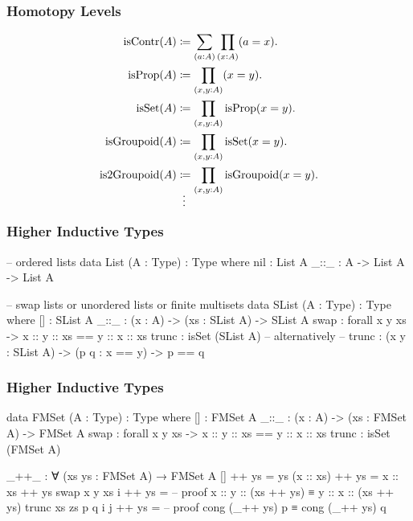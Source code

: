 \documentclass[9pt]{beamer}
\begin{document}
\begin{frame}
\frametitle{Homotopy Levels}

\begin{align*}
  \text{isContr}(A) & \coloneqq \sum_{(a:A)} \prod_{(x:A)} (a = x).
  \\
  \text{isProp}(A) & \coloneqq \prod_{(x,y:A)} (x = y).
  \\
  \text{isSet}(A) & \coloneqq \prod_{(x,y:A)} \text{isProp}(x = y).
  \\
  \text{isGroupoid}(A) & \coloneqq \prod_{(x,y:A)} \text{isSet}(x = y).
  \\
  \text{is2Groupoid}(A) & \coloneqq \prod_{(x,y:A)} \text{isGroupoid}(x = y).
  \\
  \shortvdotswithin{=}
\end{align*}

\end{frame}


\begin{frame}[fragile]
\frametitle{Higher Inductive Types}

\begin{code}
-- ordered lists
data List (A : Type) : Type where
  nil : List A
  _::_ : A -> List A -> List A

-- swap lists or unordered lists or finite multisets
data SList (A : Type) : Type where
  []    : SList A
  _::_  : (x : A) -> (xs : SList A) -> SList A
  swap  : forall x y xs -> x :: y :: xs == y :: x :: xs
  trunc : isSet (SList A)
  -- alternatively
  -- trunc : (x y : SList A) -> (p q : x == y) -> p == q
\end{code}

\end{frame}

\begin{frame}[fragile]
\frametitle{Higher Inductive Types}

\begin{code}
data FMSet (A : Type) : Type where
  []    : FMSet A
  _::_  : (x : A) -> (xs : FMSet A) -> FMSet A
  swap  : forall x y xs -> x :: y :: xs == y :: x :: xs
  trunc : isSet (FMSet A)

_++_ : ∀ (xs ys : FMSet A) → FMSet A
[] ++ ys = ys
(x :: xs) ++ ys = x :: xs ++ ys
swap x y xs i ++ ys =
  -- proof x :: y :: (xs ++ ys) ≡ y :: x :: (xs ++ ys)
trunc xs zs p q i j ++ ys =
  -- proof cong (_++ ys) p ≡ cong (_++ ys) q
\end{code}

\end{frame}
\end{document}
